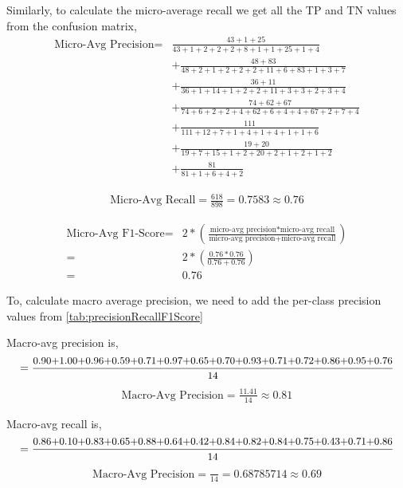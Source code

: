 Similarly, to calculate the micro-average recall we get all the \gls{TP} and \gls{TN} values from the confusion matrix,
\begin{align*}
    \text{Micro-Avg Precision} =& \frac{43+1+25}{43+1+2+2+2+8+1+1+25+1+4} \\
    & + \frac{48+83}{48+2+1+2+2+2+11+6+83+1+3+7}\\
    & + \frac{36+11}{36+1+14+1+2+2+11+3+3+2+3+4}\\
    & + \frac{74+62+67}{74+6+2+2+4+62+6+4+4+67+2+7+4}\\
    & + \frac{111}{111+12+7+1+4+1+4+1+1+6}\\
    & + \frac{19+20}{19+7+15+1+2+20+2+1+2+1+2}\\
    & + \frac{81}{81+1+6+4+2}
\end{align*}

\begin{align}
    \text{Micro-Avg Recall} = \frac{618}{898} = 0.7583 \approx 0.76
\end{align}


\begin{align}
    \text{Micro-Avg F1-Score} = &2 * \left ( \frac{\text{micro-avg precision} * \text{micro-avg recall}}{\text{micro-avg precision}+\text{micro-avg recall}} \right ) \\
                              = &2 * \left ( \frac{0.76*0.76}{0.76+0.76} \right ) \\
                              = & 0.76  
\end{align}


To, calculate macro average precision, we need to add the per-class precision values from \ref{tab:precisionRecallF1Score}

Macro-avg precision is, 
\begin{align*}
    =\frac{\text{\small 0.90+1.00+0.96+0.59+0.71+0.97+0.65+0.70+0.93+0.71+0.72+0.86+0.95+0.76}}{\text{\small 14}}
\end{align*}
\begin{align}
    \text{Macro-Avg Precision} =  \frac{11.41}{14} \approx 0.81
\end{align}

Macro-avg recall is, 
\begin{align*}
    =\frac{\text{\small 0.86+0.10+0.83+0.65+0.88+0.64+0.42+0.84+0.82+0.84+0.75+0.43+0.71+0.86}}{\text{\small 14}}
\end{align*}
\begin{align}
    \text{Macro-Avg Precision} =  \frac{}{14} = 0.68785714 \approx 0.69
\end{align}


